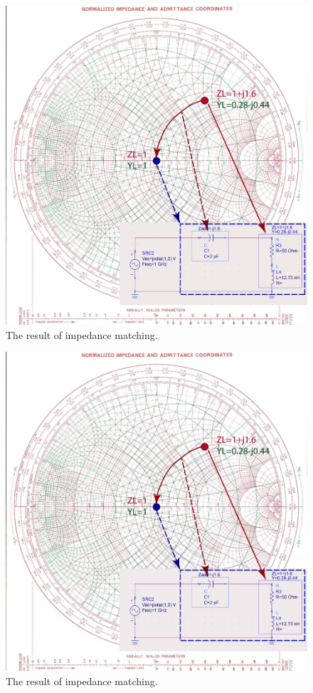 \documentclass{ximera}
\begin{document}
\begin{figure}[htbp]
\begin{center}
\includegraphics[scale=0.4]{../jpg/SimpleMatch-01larger.jpg}
\end{center}
\caption{The result of impedance matching.}
\label{fig:SimpleMatch}
\end{figure}

\begin{figure}[htbp]
\begin{center}
\includegraphics[scale=0.4]{../jpg/SimpleMatch-01med.jpg}
\end{center}
\caption{The result of impedance matching.}
\label{fig:SimpleMatch}
\end{figure}
\end{document}
